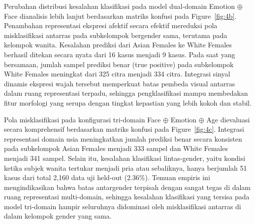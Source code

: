 Perubahan distribusi kesalahan klasifikasi pada model dual-domain Emotion $\oplus$ Face dianalisis lebih lanjut berdasarkan matriks konfusi pada Figure~\ref{fig:4b}. Penambahan representasi ekspresi afektif secara efektif mereduksi pola misklasifikasi antarras pada subkelompok bergender sama, terutama pada kelompok wanita. Kesalahan prediksi dari Asian Females ke White Females berhasil ditekan secara nyata dari 16 kasus menjadi 9 kasus. Pada saat yang bersamaan, jumlah sampel prediksi benar (true positive) pada subkelompok White Females meningkat dari 325 citra menjadi 334 citra. Integrasi sinyal dinamis ekspresi wajah tersebut memperkuat batas pembeda visual antarras dalam ruang representasi terpadu, sehingga pengklasifikasi mampu membedakan fitur morfologi yang serupa dengan tingkat kepastian yang lebih kokoh dan stabil.

Pola misklasifikasi pada konfigurasi tri-domain Face $\oplus$ Emotion $\oplus$ Age dievaluasi secara komprehensif berdasarkan matriks konfusi pada Figure~\ref{fig:4c}. Integrasi representasi domain usia meningkatkan jumlah prediksi benar secara konsisten pada subkelompok Asian Females menjadi 333 sampel dan White Females menjadi 341 sampel. Selain itu, kesalahan klasifikasi lintas-gender, yaitu kondisi ketika subjek wanita tertukar menjadi pria atau sebaliknya, hanya berjumlah 51 kasus dari total 2,160 data uji held-out (2.36\%). Temuan empiris ini mengindikasikan bahwa batas antargender terpisah dengan sangat tegas di dalam ruang representasi multi-domain, sehingga kesalahan klasifikasi yang tersisa pada model tri-domain hampir seluruhnya didominasi oleh misklasifikasi antarras di dalam kelompok gender yang sama.
